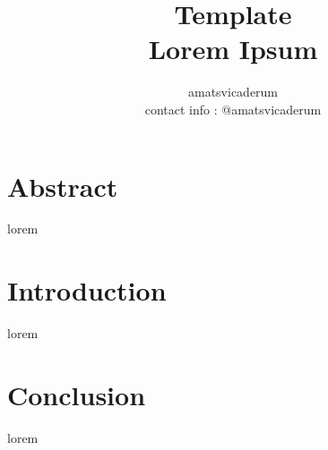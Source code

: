 \documentclass[11pt]{article}
\title{\bf{Template}\\ \bf{\normalsize Lorem Ipsum}}
\author{amatsvicaderum\\
\normalsize contact info : @amatsvicaderum\\
}
\begin{document}
    \begin{titlepage}
      \maketitle
      \thispagestyle{empty}
    \end{titlepage}
    \section{Abstract}
    lorem
    \newpage
    \section{Introduction}
    lorem
    \newpage
    \section{Conclusion}
    lorem
    \newpage
  
\end{document}
